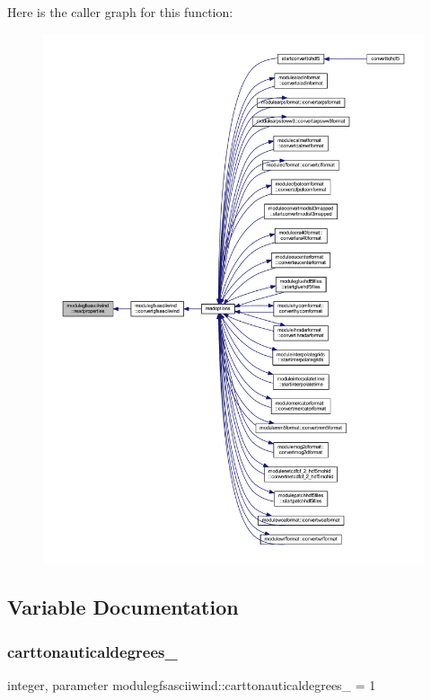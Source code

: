 Here is the caller graph for this function\+:\nopagebreak
\begin{figure}[H]
\begin{center}
\leavevmode
\includegraphics[width=350pt]{namespacemodulegfsasciiwind_a59e80d4f0ead06a644744e644d4504a0_icgraph}
\end{center}
\end{figure}


\subsection{Variable Documentation}
\mbox{\label{namespacemodulegfsasciiwind_a0a6e81b60bce37217f1aa7c7cb238e61}} 
\subsubsection{\texorpdfstring{carttonauticaldegrees\+\_\+}{carttonauticaldegrees\_}}
{\footnotesize\ttfamily integer, parameter modulegfsasciiwind\+::carttonauticaldegrees\+\_\+ = 1\hspace{0.3cm}{\ttfamily [private]}}

